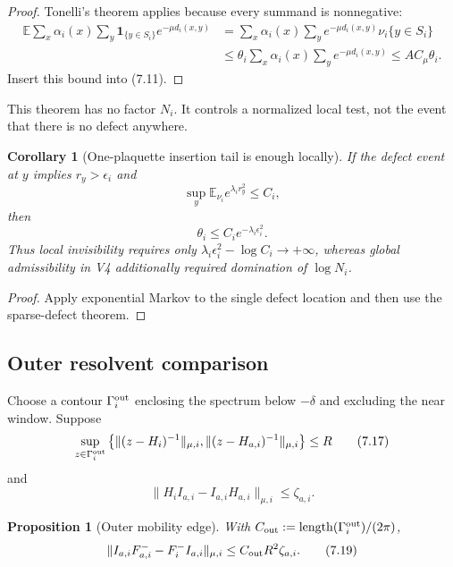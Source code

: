 \documentclass[11pt]{article}
\newtheorem{proposition}[theorem]{Proposition}
\newtheorem{corollary}[theorem]{Corollary}
\begin{document}
\begin{proof}
Tonelli's theorem applies because every summand is nonnegative:
\[
\begin{split}
 \mathbb E
 \sum_x\alpha_i(x)\sum_y
 \mathbf1_{\{y\in S_i\}}e^{-\mu d_i(x,y)}
 &=
 \sum_x\alpha_i(x)\sum_y
 e^{-\mu d_i(x,y)}\nu_i\{y\in S_i\}\\
 &\leq
 \theta_i\sum_x\alpha_i(x)
 \sum_y e^{-\mu d_i(x,y)}
 \leq AC_\mu\theta_i.
\end{split}
\]
Insert this bound into (7.11).
\end{proof}

This theorem has no factor \(N_i\).  It controls a normalized local test,
not the event that there is no defect anywhere.

\begin{corollary}[One-plaquette insertion tail is enough locally]
\label{cor:v11v7-insertion}
If the defect event at \(y\) implies \(r_y>\epsilon_i\) and
\[
 \sup_y\mathbb E_{\nu_i}e^{\lambda_i r_y^2}\leq C_i,
 \tag{7.15}
\]
then
\[
 \theta_i\leq C_ie^{-\lambda_i\epsilon_i^2}.
 \tag{7.16}
\]
Thus local invisibility requires only
\(\lambda_i\epsilon_i^2-\log C_i\to+\infty\), whereas global
admissibility in V4 additionally required domination of \(\log N_i\).
\end{corollary}

\begin{proof}
Apply exponential Markov to the single defect location and then use the
sparse-defect theorem.
\end{proof}

\subsection{Outer resolvent comparison}

Choose a contour \(\Gamma_i^{\rm out}\) enclosing the spectrum below
\(-\delta\) and excluding the near window.  Suppose
\[
 \sup_{z\in\Gamma_i^{\rm out}}
 \left\{
 \|(z-H_i)^{-1}\|_{\mu,i},
 \|(z-H_{a,i})^{-1}\|_{\mu,i}
 \right\}\leq R
 \tag{7.17}
\]
and
\[
 \|H_iI_{a,i}-I_{a,i}H_{a,i}\|_{\mu,i}\leq\zeta_{a,i}.
 \tag{7.18}
\]

\begin{proposition}[Outer mobility edge]
\label{prop:v11v7-outer}
With
\(C_{\rm out}:=\operatorname{length}(\Gamma_i^{\rm out})/(2\pi)\),
\[
 \|I_{a,i}F_{a,i}^- -F_i^-I_{a,i}\|_{\mu,i}
 \leq C_{\rm out}R^2\zeta_{a,i}.
 \tag{7.19}
\]
\end{proposition}
\end{document}
